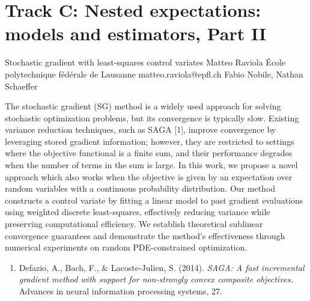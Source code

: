\section{Track C: Nested expectations: models and estimators, Part II}\newpage

\begin{talk}
  {Stochastic gradient with least-squares control variates}%
  {Matteo Raviola}%
  {\'Ecole polytechnique f\'ed\'erale de Lausanne}%
  {matteo.raviola@epfl.ch}%
  {Fabio Nobile, Nathan Schaeffer}%
  
  
  
  The stochastic gradient (SG) method is a widely used approach for solving stochastic optimization problems, but its convergence is typically slow.
  Existing variance reduction techniques, such as SAGA [1], improve convergence by leveraging stored gradient information; however, they are restricted to settings where the objective functional is a finite sum, and their performance degrades when the number of terms in the sum is large.
  In this work, we propose a novel approach which also works when the objective is given by an expectation over random variables with a continuous probability distribution.
  Our method constructs a control variate by fitting a linear model to past gradient evaluations using weighted discrete least-squares, effectively reducing variance while preserving computational efficiency.
  We establish theoretical sublinear convergence guarantees and demonstrate the method's effectiveness through numerical experiments on random PDE-constrained optimization.
  
  \medskip
  
  \begin{enumerate}
    \item[{[1]}] Defazio, A., Bach, F., \& Lacoste-Julien, S. (2014). {\it SAGA: A fast incremental gradient method with support for non-strongly convex composite objectives.} Advances in neural information processing systems, 27.
  \end{enumerate}
  
\end{talk}

